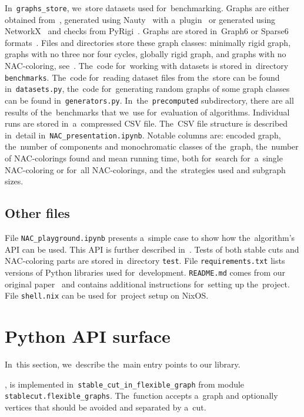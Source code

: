 In~\texttt{graphs\_store}, we~store datasets used for~benchmarking.
Graphs are either obtained from~\cite{extremal_graphs},
generated using Nauty~\cite{nauty} with a~plugin~\cite{nauty_plugin}
or generated using NetworkX~\cite{networkx} and checks from PyRigi~\cite{pyrigi}.
Graphs are stored in~Graph6 or Sparse6 formats~\cite{graph6}.
%
Files and directories store these graph classes:
minimally rigid graph, graphs with no three nor four cycles, globally rigid graph,
and graphs with no NAC-coloring, see~.
%
The~code for~working with datasets is stored in~directory \texttt{benchmarks}.
The~code for~reading dataset files from the~store can be found in~\texttt{datasets.py},
the~code for~generating random graphs of some graph classes
can be found in~\texttt{generators.py}.
%
In~the~\texttt{precomputed} subdirectory, there are all results of the~benchmarks that
we~use for~evaluation of algorithms.
Individual runs are stored in~a~compressed CSV file.
The~CSV file structure is described in~detail in~\texttt{NAC\_presentation.ipynb}.
Notable columns are:
encoded graph,
the~number of \trcon{} components and monochromatic classes of the~graph,
the~number of NAC-colorings found and mean running time,
both for~search for~a~single NAC-coloring or for~all NAC-colorings,
and the~strategies used and subgraph sizes.


\subsection{Other files}

File \texttt{NAC\_playground.ipynb} presents a~simple case
to show how the~algorithm's API can be used.
This API is further described in~.
%
Tests of both stable cuts and NAC-coloring parts are stored in~directory \texttt{test}.
%
File \texttt{requirements.txt} lists versions of Python libraries used for~development.
\texttt{README.md} comes from our original paper~\cite{my_paper}
and contains additional instructions for~setting up the~project.
File \texttt{shell.nix} can be used for~project setup on NixOS\@.


\section{Python API surface}%
\label{sec:impl_python_api}

In~this section,
we~describe the~main entry points to our library.

,
is implemented in~\texttt{stable\_cut\_in\_flexible\_graph}
from module \texttt{stablecut.flexible\_graphs}.
The~function accepts a~graph and
optionally vertices that should be avoided and separated by a~cut.

